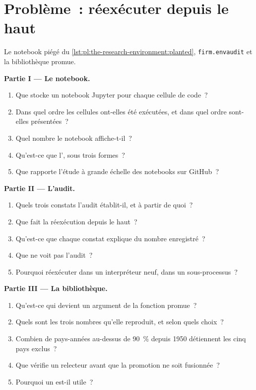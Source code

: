\section{Problème~: réexécuter depuis le haut}

\begin{problem}\label{pb:pl:the-research-environment:1}
Le notebook piégé du \cref{lst:pl:the-research-environment:planted}, \texttt{firm.envaudit} et la bibliothèque promue.

\medskip\noindent\textbf{Partie I --- Le notebook.}
\begin{enumerate}
\item Que stocke un notebook Jupyter pour chaque cellule de code~?
\item Dans quel ordre les cellules ont-elles été exécutées, et dans quel ordre sont-elles présentées~?
\item Quel nombre le notebook affiche-t-il~?
\item Qu'est-ce que l', sous trois formes~?
\item Que rapporte l'étude à grande échelle des notebooks sur GitHub~?
\end{enumerate}

\medskip\noindent\textbf{Partie II --- L'audit.}
\begin{enumerate}[resume]
\item Quels trois constats l'audit établit-il, et à partir de quoi~?
\item Que fait la réexécution depuis le haut~?
\item Qu'est-ce que chaque constat explique du nombre enregistré~?
\item Que ne voit pas l'audit~?
\item Pourquoi réexécuter dans un interpréteur neuf, dans un sous-processus~?
\end{enumerate}

\medskip\noindent\textbf{Partie III --- La bibliothèque.}
\begin{enumerate}[resume]
\item Qu'est-ce qui devient un argument de la fonction promue~?
\item Quels sont les trois nombres qu'elle reproduit, et selon quels choix~?
\item Combien de pays-années au-dessus de 90~\% depuis 1950 détiennent les cinq pays exclus~?
\item Que vérifie un relecteur avant que la promotion ne soit fusionnée~?
\item Pourquoi un  est-il utile~?
\end{enumerate}


\end{problem}
